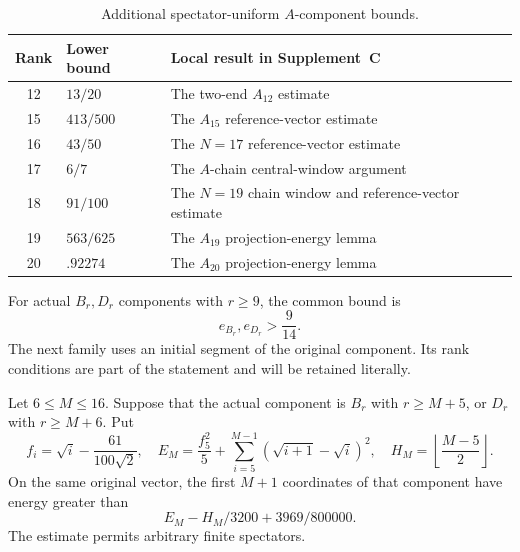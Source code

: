 \begin{table}[htbp]
\centering
\caption{Additional spectator-uniform $A$-component bounds.}
\label{c:A-table}
\begin{tabular}{clp{.57\linewidth}}
\toprule
Rank&Lower bound&Local result in Supplement~C\\\midrule
12&$13/20$&The two-end $A_{12}$ estimate\\
15&$413/500$&The $A_{15}$ reference-vector estimate\\
16&$43/50$&The $N=17$ reference-vector estimate\\
17&$6/7$&The $A$-chain central-window argument\\
18&$91/100$&The $N=19$ chain window and reference-vector estimate\\
19&$563/625$&The $A_{19}$ projection-energy lemma\\
20&$.92274$&The $A_{20}$ projection-energy lemma\\\bottomrule
\end{tabular}
\end{table}

For actual $B_r,D_r$ components with $r\ge9$, the common bound is
\begin{equation}\label{c:BD-nine}
                         e_{B_r},e_{D_r}>\frac9{14}.
\end{equation}
The next family uses an initial segment of the original component. Its
rank conditions are part of the statement and will be retained literally.

\begin{proposition}
\label{c:prefix-input}
Let $6\le M\le16$. Suppose that the actual component is $B_r$ with
$r\ge M+5$, or $D_r$ with $r\ge M+6$. Put
\[
 f_i=\sqrt i-\frac{61}{100\sqrt2},\quad
 E_M=\frac{f_5^2}{5}+
        \sum_{i=5}^{M-1}(\sqrt{i+1}-\sqrt i)^2,
 \quad H_M=\left\lfloor\frac{M-5}{2}\right\rfloor.
\]
On the same original vector, the first $M+1$ coordinates of that
component have energy greater than
\begin{equation}\label{c:prefix-formula}
                  E_M-H_M/3200+3969/800000.
\end{equation}
The estimate permits arbitrary finite spectators.
\end{proposition}

